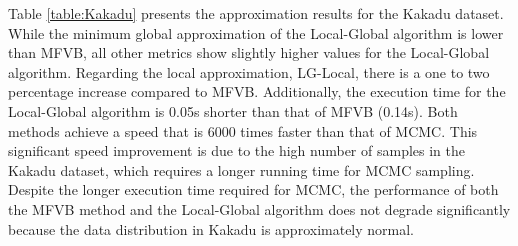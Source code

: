 \begin{table}[!h]
	\caption{Experiment Result on Kakadu dataset}
	\label{table:Kakadu}
\end{table}

Table \ref{table:Kakadu} presents the approximation results for the Kakadu dataset. While the minimum global approximation of the Local-Global algorithm is lower than MFVB, all other metrics show slightly higher values for the Local-Global algorithm. Regarding the local approximation, LG-Local, there is a one to two percentage increase compared to MFVB. Additionally, the execution time for the Local-Global algorithm is 0.05s shorter than that of MFVB (0.14s). Both methods achieve a speed that is 6000 times faster than that of MCMC. This significant speed improvement is due to the high number of samples in the Kakadu dataset, which requires a longer running time for MCMC sampling.
Despite the longer execution time required for MCMC, the performance of both the MFVB method and the Local-Global algorithm does not degrade significantly because the data distribution in Kakadu is approximately normal.

\begin{table}[!h]
	\caption{Experiment Result on bodyfat dataset}
	\label{table:bodyfat}
\end{table}

